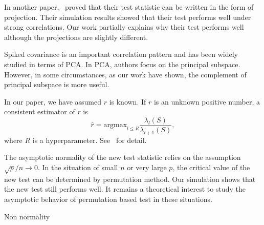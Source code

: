 \documentclass[review]{elsarticle}
\theoremstyle{plain}
\newtheorem{lemma}{\quad\quad Lemma}
\theoremstyle{definition}
\theoremstyle{remark}
\begin{document}

In another paper,~\cite{Zhao2016A} proved that their test statistic can be written in the form of projection. Their simulation results showed that their test performs well under strong correlations.
Our work partially explains why their test performs well although the projections are slightly different. 

 Spiked covariance is an important correlation pattern and has been widely studied in terms of PCA\@.
 In PCA, authors focus on the principal subspace.
 However, in some circumstances, as our work have shown, the complement of principal subspace is more useful. 

In our paper, we have assumed $r$ is known. If $r$ is an unknown positive number, a consistent estimator of $r$ is
\begin{equation}\label{estimateR}
    \hat{r}=\textrm{argmax}_{l\leq R}\frac{\lambda_l(S)}{\lambda_{l+1}(S)},
\end{equation}
where $R$ is a hyperparameter.
    See~\cite{Ahn2009Eigenvalue} for detail.


The asymptotic normality of the new test statistic relies on the assumption $\sqrt{p}/n\to 0$. In the situation of small $n$ or very large $p$, the critical value of the new test can be determined by permutation method. Our simulation shows that the new test still performs well. It remains a theoretical interest to study the asymptotic behavior of permutation based test in these situations.

{\color{red}
Non normality
}



\end{document}
